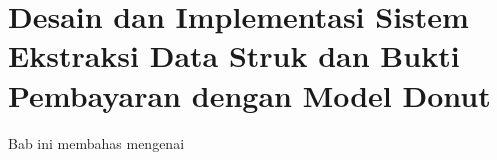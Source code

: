 \chapter{Desain dan Implementasi Sistem Ekstraksi Data Struk dan Bukti Pembayaran dengan Model Donut}
\label{chapter:desain-implementasi}
Bab ini membahas mengenai






